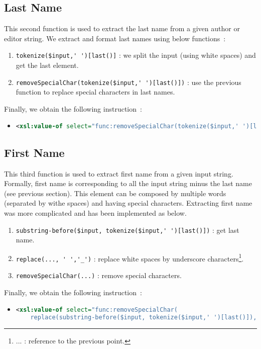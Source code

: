 \documentclass{article}
\begin{document}
  \subsection{Last Name} 
    This second function is used to extract the last name from a given author or editor string. We extract and format last names using below functions~:
    \begin{enumerate}
      \item \verb|tokenize($input,' ')[last()]| : we split the input (using white spaces) and get the last element.
      \item \verb|removeSpecialChar(tokenize($input,' ')[last()])| : use the previous function to replace special characters in last names.
    \end{enumerate}
    Finally, we obtain the following instruction~:
    \begin{itemize}
      \item \begin{lstlisting}[language=XML]
<xsl:value-of select="func:removeSpecialChar(tokenize($input,' ')[last()])"/>\end{lstlisting}
    \end{itemize}

  \subsection{First Name} 
    This third function is used to extract first name from a given input string. Formally, first name is corresponding to all the input string minus the last name (see previous section). This element can be composed by multiple words (separated by withe spaces) and having special characters. Extracting first name was more complicated and has been implemented as below.
    \begin{enumerate}
      \item \verb|substring-before($input, tokenize($input,' ')[last()])| : get last name.
      \item \verb|replace(..., ' ','_')| : replace white spaces by underscore characters\footnote{ ... : reference to the previous point.}.
      \item \verb|removeSpecialChar(...)| : remove special characters.
    \end{enumerate}
    Finally, we obtain the following instruction~:
    \begin{itemize}
      \item \begin{lstlisting}[language=XML]
<xsl:value-of select="func:removeSpecialChar(
    replace(substring-before($input, tokenize($input,' ')[last()]), ' ' ,'_'))"/>\end{lstlisting}
    \end{itemize}
\end{document}
